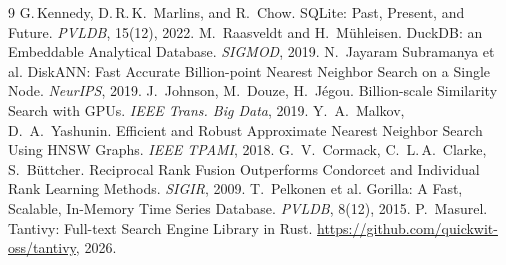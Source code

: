 \documentclass[10pt]{article}
\begin{document}
\begin{thebibliography}{9}\small
{} G.\,Kennedy, D.\,R.\,K.~Marlins, and R.~Chow.
SQLite: Past, Present, and Future. \emph{PVLDB}, 15(12), 2022.
 M.~Raasveldt and H.~M\"uhleisen. DuckDB: an Embeddable
Analytical Database. \emph{SIGMOD}, 2019.
 N.~Jayaram Subramanya et al. DiskANN: Fast Accurate
Billion-point Nearest Neighbor Search on a Single Node. \emph{NeurIPS},
2019.
 J.~Johnson, M.~Douze, H.~J\'egou. Billion-scale Similarity
Search with GPUs. \emph{IEEE Trans. Big Data}, 2019.
 Y.~A.~Malkov, D.~A.~Yashunin. Efficient and Robust
Approximate Nearest Neighbor Search Using HNSW Graphs. \emph{IEEE TPAMI},
2018.
 G.~V.~Cormack, C.~L.\,A.~Clarke, S.~B\"uttcher.
Reciprocal Rank Fusion Outperforms Condorcet and Individual Rank Learning
Methods. \emph{SIGIR}, 2009.
 T.~Pelkonen et al. Gorilla: A Fast, Scalable, In-Memory
Time Series Database. \emph{PVLDB}, 8(12), 2015.
 P.~Masurel. Tantivy: Full-text Search Engine Library in
Rust. \url{https://github.com/quickwit-oss/tantivy}, 2026.
\end{thebibliography}
\end{document}
